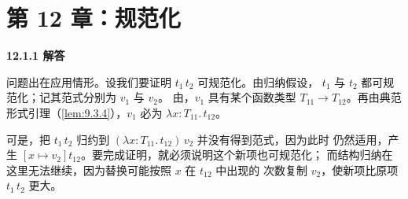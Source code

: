 \section{第 12 章：规范化}

\begin{taplauthorsolutionentrybox}
\label{sol:author:12.1.1}
\textbf{12.1.1 解答}

问题出在应用情形。设我们要证明 \(t_1\,t_2\) 可规范化。由归纳假设，
\(t_1\) 与 \(t_2\) 都可规范化；记其范式分别为 \(v_1\) 与 \(v_2\)。
由，\(v_1\) 具有某个函数类型
\(T_{11}\to T_{12}\)。再由典范形式引理（\cref{lem:9.3.4}），\(v_1\)
必为 \(\lambda x:T_{11}.\,t_{12}\)。

可是，把 \(t_1\,t_2\) 归约到
\((\lambda x:T_{11}.\,t_{12})\,v_2\) 并没有得到范式，因为此时
 仍然适用，产生
\([x\mapsto v_2]t_{12}\)。要完成证明，就必须说明这个新项也可规范化；
而结构归纳在这里无法继续，因为替换可能按照 \(x\) 在 \(t_{12}\) 中出现的
次数复制 \(v_2\)，使新项比原项 \(t_1\,t_2\) 更大。

\end{taplauthorsolutionentrybox}


